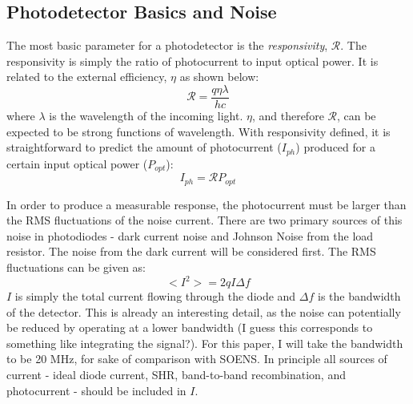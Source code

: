 \documentclass[twocolumn]{article}
\begin{document}
\subsection{Photodetector Basics and Noise}

The most basic parameter for a photodetector is the \textit{responsivity}, $\mathcal{R}$. The responsivity is simply the ratio of photocurrent to input optical power. It is related to the external efficiency, $\eta$ as shown below:
\begin{equation}
    \mathcal{R} = \frac{q\eta\lambda}{hc}
\end{equation}
where $\lambda$ is the wavelength of the incoming light. $\eta$, and therefore $\mathcal{R}$, can be expected to be strong functions of wavelength. With responsivity defined, it is straightforward to predict the amount of photocurrent ($I_{ph}$) produced for a certain input optical power ($P_{opt}$):
\begin{equation}
    I_{ph} = \mathcal{R}P_{opt}
\end{equation}

In order to produce a measurable response, the photocurrent must be larger than the RMS fluctuations of the noise current. There are two primary sources of this noise in photodiodes - dark current noise and Johnson Noise from the load resistor. The noise from the dark current will be considered first. The RMS fluctuations can be given as:
\begin{equation}
    <I^{2}> = 2qI\Delta f
\end{equation}
$I$ is simply the total current flowing through the diode and $\Delta f$ is the bandwidth of the detector. This is already an interesting detail, as the noise can potentially be reduced by operating at a lower bandwidth (I guess this corresponds to something like integrating the signal?). For this paper, I will take the bandwidth to be 20 MHz, for sake of comparison with SOENS. In principle all sources of current - ideal diode current, SHR, band-to-band recombination, and photocurrent - should be included in $I$. 
\end{document}
